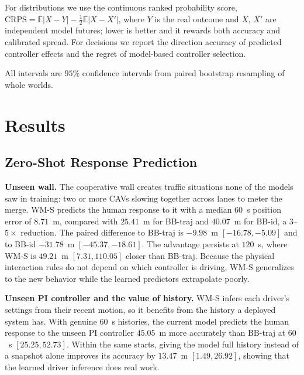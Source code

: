 \documentclass[conference]{IEEEtran}
\begin{document}
For distributions we use the continuous ranked probability score, $\mathrm{CRPS}=\mathbb{E}|X-Y|-\tfrac12\mathbb{E}|X-X'|$, where $Y$ is the real outcome and $X$, $X'$ are independent model futures; lower is better and it rewards both accuracy and calibrated spread. For decisions we report the direction accuracy of predicted controller effects and the regret of model-based controller selection.

All intervals are $95\%$ confidence intervals from paired bootstrap resampling of whole worlds. %

\section{Results}
\subsection{Zero-Shot Response Prediction}
\textbf{Unseen wall.} The cooperative wall creates traffic situations none of the models saw in training: two or more CAVs slowing together across lanes to meter the merge. WM-S predicts the human response to it with a median $60$~s position error of $8.71$~m, compared with $25.41$~m for BB-traj and $40.07$~m for BB-id, a $3$--$5\times$ reduction. %
The paired difference to BB-traj is $-9.98$~m $[-16.78,-5.09]$ and to BB-id $-31.78$~m $[-45.37,-18.61]$. %
The advantage persists at $120$~s, where WM-S is $49.21$~m $[7.31,110.05]$ closer than BB-traj. %
Because the physical interaction rules do not depend on which controller is driving, WM-S generalizes to the new behavior while the learned predictors extrapolate poorly.

\textbf{Unseen PI controller and the value of history.} WM-S infers each driver's settings from their recent motion, so it benefits from the history a deployed system has. With genuine $60$~s histories, the current model predicts the human response to the unseen PI controller $45.05$~m more accurately than BB-traj at $60$~s $[25.25,52.73]$. %
Within the same starts, giving the model full history instead of a snapshot alone improves its accuracy by $13.47$~m $[1.49,26.92]$, showing that the learned driver inference does real work. %
\end{document}
